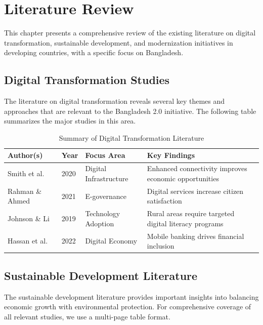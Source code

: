 \chapter{Literature Review}

This chapter presents a comprehensive review of the existing literature on digital transformation, sustainable development, and modernization initiatives in developing countries, with a specific focus on Bangladesh.

\section{Digital Transformation Studies}

The literature on digital transformation reveals several key themes and approaches that are relevant to the Bangladesh 2.0 initiative. The following table summarizes the major studies in this area.

\begin{table}[h!]
\centering
\caption{Summary of Digital Transformation Literature}
\label{tab:digital_transformation}
\begin{tabular}{|p{3cm}|p{2.5cm}|p{4cm}|p{3.5cm}|}
\hline
\textbf{Author(s)} & \textbf{Year} & \textbf{Focus Area} & \textbf{Key Findings} \\
\hline
Smith et al. & 2020 & Digital Infrastructure & Enhanced connectivity improves economic opportunities \\
\hline
Rahman \& Ahmed & 2021 & E-governance & Digital services increase citizen satisfaction \\
\hline
Johnson \& Li & 2019 & Technology Adoption & Rural areas require targeted digital literacy programs \\
\hline
Hassan et al. & 2022 & Digital Economy & Mobile banking drives financial inclusion \\
\hline
\end{tabular}
\end{table}

\section{Sustainable Development Literature}

The sustainable development literature provides important insights into balancing economic growth with environmental protection. For comprehensive coverage of all relevant studies, we use a multi-page table format.


